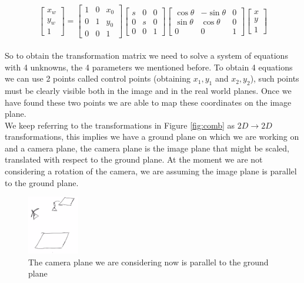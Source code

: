 \[
    \begin{bmatrix}
    x_w \\
    y_w \\
    1
    \end{bmatrix}
    =
    \begin{bmatrix}
    1 & 0 & x_0 \\
    0 & 1 & y_0 \\
    0 & 0 & 1
    \end{bmatrix}
    \begin{bmatrix}
        s & 0 & 0 \\
        0 & s & 0 \\
        0 & 0 & 1
    \end{bmatrix}
    \begin{bmatrix}
    \cos\theta & -\sin\theta & 0 \\
    \sin\theta & \cos\theta & 0 \\
    0 & 0 & 1
    \end{bmatrix}
    \begin{bmatrix}
        x \\
        y \\
        1
    \end{bmatrix}
\]
\\
So to obtain the transformation matrix we need to solve a system of equations with 4 unknowns, the 4 parameters we mentioned before. To obtain 4 equations we can use 2 points called control points (obtaining \(x_1, y_1\) and \(x_2, y_2\)), such points must be clearly visible both in the image and in the real world planes. Once we have found these two points we are able to map these coordinates on the image plane.
\\
We keep referring to the transformations in Figure \ref{fig:comb} as \(2D \rightarrow 2D \) transformations, this implies we have a ground plane on which we are working on and a camera plane, the camera plane is the image plane that might be scaled, translated with respect to the ground plane. At the moment we are not considering a rotation of the camera, we are assuming the image plane is parallel to the ground plane.

\begin{figure}[H]
    \centering
    \includegraphics[width=0.2\textwidth]{Figures/planes.png}
    \caption{The camera plane we are considering now is parallel to the ground plane}
    \label{fig:planes}
\end{figure}

